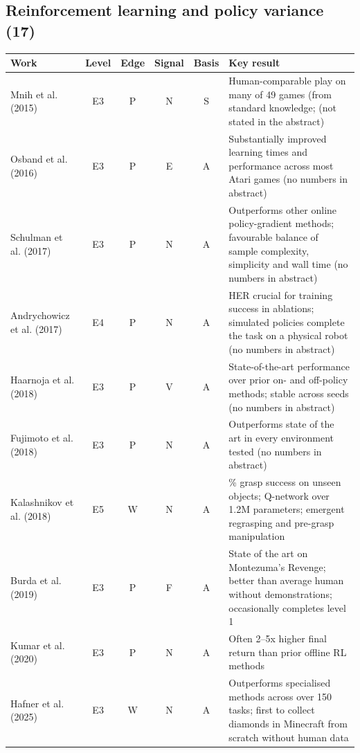 \documentclass[10pt,a4paper]{article}
\begin{document}
\subsection*{Reinforcement learning and policy variance (17)}
\begin{longtable}{@{}>{\raggedright\arraybackslash}p{4.0cm}cccc>{\raggedright\arraybackslash}p{7.6cm}@{}}
\toprule \textbf{Work} & \textbf{Level} & \textbf{Edge} & \textbf{Signal} & \textbf{Basis} & \textbf{Key result} \\ \midrule \endhead
Mnih et al. (2015)~\cite{Mnih2015} & E3 & P & N & S & Human-comparable play on many of 49 games (from standard knowledge; (not stated in the abstract) \\
Osband et al. (2016)~\cite{Osband2016} & E3 & P & E & A & Substantially improved learning times and performance across most Atari games (no numbers in abstract) \\
Schulman et al. (2017)~\cite{Schulman2017} & E3 & P & N & A & Outperforms other online policy-gradient methods; favourable balance of sample complexity, simplicity and wall time (no numbers in abstract) \\
Andrychowicz et al. (2017)~\cite{Andrychowicz2017} & E4 & P & N & A & HER crucial for training success in ablations; simulated policies complete the task on a physical robot (no numbers in abstract) \\
Haarnoja et al. (2018)~\cite{Haarnoja2018} & E3 & P & V & A & State-of-the-art performance over prior on- and off-policy methods; stable across seeds (no numbers in abstract) \\
Fujimoto et al. (2018)~\cite{Fujimoto2018} & E3 & P & N & A & Outperforms state of the art in every environment tested (no numbers in abstract) \\
Kalashnikov et al. (2018)~\cite{Kalashnikov2018} & E5 & W & N & A & 96\% grasp success on unseen objects; Q-network over 1.2M parameters; emergent regrasping and pre-grasp manipulation \\
Burda et al. (2019)~\cite{Burda2019} & E3 & P & F & A & State of the art on Montezuma's Revenge; better than average human without demonstrations; occasionally completes level 1 \\
Kumar et al. (2020)~\cite{Kumar2020} & E3 & P & N & A & Often 2--5x higher final return than prior offline RL methods \\
Hafner et al. (2025)~\cite{Hafner2023} & E3 & W & N & A & Outperforms specialised methods across over 150 tasks; first to collect diamonds in Minecraft from scratch without human data \\

\end{longtable}
\end{document}
